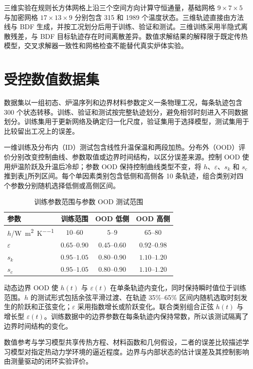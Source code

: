 三维实验在规则长方体网格上沿三个空间方向计算守恒通量，基础网格 $9\times7\times5$ 与加密网格 $17\times13\times9$ 分别包含 315 和 1989 个温度状态。三维轨迹直接由方法线与 BDF 生成，并按工况划分后用于训练、验证和测试。三维训练采用半隐式离散残差，与 BDF 目标轨迹存在时间离散差异。数值求解结果的解释限于既定传热模型，交叉求解器一致性和网格检查不能替代真实炉体实验。

\section{受控数值数据集}
\label{sec:dataset-design}

数据集以一组初态、炉温序列和边界材料参数定义一条物理工况，每条轨迹包含 300 个状态转移。训练、验证和测试按完整轨迹划分，避免相邻时刻进入不同数据划分。训练集用于更新网络及确定归一化尺度，验证集用于选择模型，测试集用于比较留出工况上的误差。

一维训练及分布内（ID）测试包含线性升温保温和两段加热。分布外（OOD）评价分别改变控制曲线、参数取值或边界时间结构，以区分误差来源。控制 OOD 使用炉温阶跃及升温后冷却；参数 OOD 保持控制曲线类型不变，将 $h$、$\varepsilon$、$s_k$ 和 $s_c$ 推到表\ref{tab:ood_ranges}所列区间。每个单因素类别包含低侧和高侧各 10 条轨迹，组合类别对四个参数分别随机选择低侧或高侧区间。

\begin{table}[H]
  \centering
  \caption{训练参数范围与参数 OOD 测试范围}
  \label{tab:ood_ranges}
  \begin{tabular}{lccc}
    \toprule
    参数 & 训练范围 & OOD 低侧 & OOD 高侧 \\
    \midrule
    $h$/\si{\watt\per\square\metre\per\kelvin} & $10$--$60$ & $5$--$9$ & $65$--$80$ \\
    $\varepsilon$ & $0.65$--$0.90$ & $0.45$--$0.60$ & $0.92$--$0.98$ \\
    $s_k$ & $0.95$--$1.05$ & $0.80$--$0.90$ & $1.10$--$1.20$ \\
    $s_c$ & $0.95$--$1.05$ & $0.80$--$0.90$ & $1.10$--$1.20$ \\
    \bottomrule
  \end{tabular}
\end{table}

动态边界 OOD 使 $h(t)$ 与 $\varepsilon(t)$ 在单条轨迹内变化，同时保持瞬时值位于训练范围。$h$ 的测试形式包括余弦平滑过渡、在轨迹 35\%--65\% 区间内随机选取时刻发生的阶跃和正弦变化；$\varepsilon$ 采用指数增长或阶跃变化。联合类别组合正弦 $h(t)$ 与增长型 $\varepsilon(t)$。训练数据中的边界参数在每条轨迹内保持常数，所以该测试隔离了边界时间结构的变化。

数值参考与学习模型共享传热方程、材料函数和几何假设，二者的误差比较描述学习模型对指定热动力学环境的逼近程度。边界与内部状态的估计误差及其控制影响由测量驱动的闭环实验评价。
